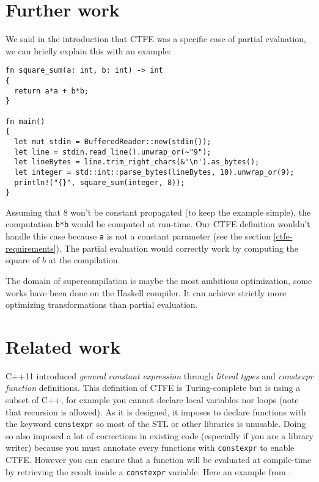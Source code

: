 \documentclass[a4paper,11pt]{article}
\begin{document}
\section{Further work}
\label{further-work}

We said in the introduction that CTFE was a specific case of partial evaluation\cite{PE}, we can briefly explain this with an example:

\begin{lstlisting}
fn square_sum(a: int, b: int) -> int
{
  return a*a + b*b;
}

fn main()
{
  let mut stdin = BufferedReader::new(stdin());
  let line = stdin.read_line().unwrap_or(~"9");
  let lineBytes = line.trim_right_chars(&'\n').as_bytes();
  let integer = std::int::parse_bytes(lineBytes, 10).unwrap_or(9);
  println!("{}", square_sum(integer, 8));
}
\end{lstlisting}

Assuming that $8$ won't be constant propagated (to keep the example simple), the computation \lstinline{b*b} would be computed at run-time. Our CTFE definition wouldn't handle this case because \lstinline{a} is not a constant parameter (see the section \ref{ctfe-requirements}). The partial evaluation would correctly work by computing the square of $b$ at the compilation.
\newline

The domain of supercompilation is maybe the most ambitious optimization, some works have been done on the Haskell compiler\cite{Bolingbroke:2010:SE:2088456.1863540}. It can achieve strictly more optimizing transformations than partial evaluation\cite{Sorensen94towardsunifying}.

\section{Related work}
\label{related-work}

C++11 introduced \textit{general constant expression} \cite{DosReis:2010:GCE:1774088.1774537} through \textit{literal types} and \textit{constexpr function} definitions. This definition of CTFE is Turing-complete but is using a subset of C++, for example you cannot declare local variables nor loops (note that recursion is allowed). As it is designed, it imposes to declare functions with the keyword \lstinline{constexpr} so most of the STL or other libraries is unusable. Doing so also imposed a lot of corrections in existing code (especially if you are a library writer) because you must annotate every functions with \lstinline{constexpr} to enable CTFE. However you can ensure that a function will be evaluated at compile-time by retrieving the result inside a \lstinline{constexpr} variable. Here an example from \cite{DosReis:2010:GCE:1774088.1774537}:
\end{document}
